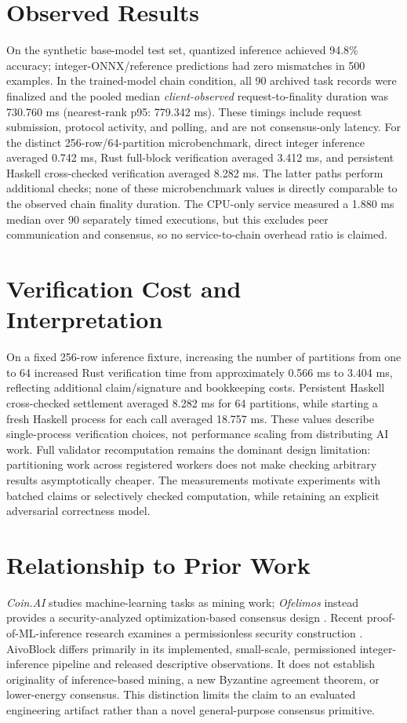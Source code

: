 \documentclass[sigconf,anonymous]{acmart}
\begin{document}
\section{Observed Results}
On the synthetic base-model test set, quantized inference achieved 94.8\% accuracy; integer-ONNX/reference predictions had zero mismatches in 500 examples. In the trained-model chain condition, all 90 archived task records were finalized and the pooled median \emph{client-observed} request-to-finality duration was 730.760 ms (nearest-rank p95: 779.342 ms). These timings include request submission, protocol activity, and polling, and are not consensus-only latency. For the distinct 256-row/64-partition microbenchmark, direct integer inference averaged 0.742 ms, Rust full-block verification averaged 3.412 ms, and persistent Haskell cross-checked verification averaged 8.282 ms. The latter paths perform additional checks; none of these microbenchmark values is directly comparable to the observed chain finality duration. The CPU-only service measured a 1.880 ms median over 90 separately timed executions, but this excludes peer communication and consensus, so no service-to-chain overhead ratio is claimed.

\section{Verification Cost and Interpretation}
On a fixed 256-row inference fixture, increasing the number of partitions from one to 64 increased Rust verification time from approximately 0.566 ms to 3.404 ms, reflecting additional claim/signature and bookkeeping costs. Persistent Haskell cross-checked settlement averaged 8.282 ms for 64 partitions, while starting a fresh Haskell process for each call averaged 18.757 ms. These values describe single-process verification choices, not performance scaling from distributing AI work. Full validator recomputation remains the dominant design limitation: partitioning work across registered workers does not make checking arbitrary results asymptotically cheaper. The measurements motivate experiments with batched claims or selectively checked computation, while retaining an explicit adversarial correctness model.

\section{Relationship to Prior Work}
\emph{Coin.AI} studies machine-learning tasks as mining work; \emph{Ofelimos} instead provides a security-analyzed optimization-based consensus design \cite{baldominos2019coinai,fitzi2022ofelimos}. Recent proof-of-ML-inference research examines a permissionless security construction \cite{wong2026poml}. AivoBlock differs primarily in its implemented, small-scale, permissioned integer-inference pipeline and released descriptive observations. It does not establish originality of inference-based mining, a new Byzantine agreement theorem, or lower-energy consensus. This distinction limits the claim to an evaluated engineering artifact rather than a novel general-purpose consensus primitive.
\end{document}
